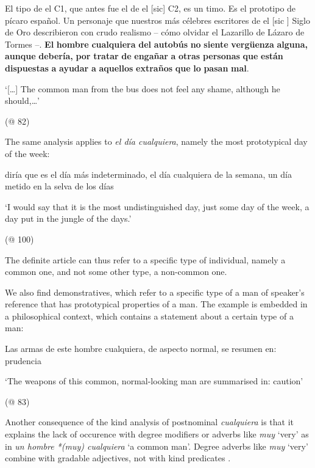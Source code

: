 \label{bkm:Ref63545986}  El tipo de el C1, que antes fue el de el [sic] C2, es un timo. Es el prototipo de pícaro español. Un personaje que nuestros más célebres escritores de el [sic ] Siglo de Oro describieron con crudo realismo – cómo olvidar el Lazarillo de Lázaro de Tormes –. \textbf{El} \textbf{hombre} \textbf{cualquiera} \textbf{del} \textbf{autobús} \textbf{no} \textbf{siente} \textbf{vergüenza} \textbf{alguna,} \textbf{aunque} \textbf{debería,} \textbf{por} \textbf{tratar} \textbf{de} \textbf{engañar} \textbf{a} \textbf{otras} \textbf{personas} \textbf{que} \textbf{están} \textbf{dispuestas} \textbf{a} \textbf{ayudar} \textbf{a} \textbf{aquellos} \textbf{extraños} \textbf{que} \textbf{lo} \textbf{pasan} \textbf{mal}.

  ‘[…] The common man from the bus does not feel any shame, although he should,…’

  (@ 82)

The same analysis applies to \textit{el día cualquiera}, namely the most prototypical day of the week:

  diría que es el día más indeterminado, el día cualquiera de la semana, un día metido en la selva de los días

  ‘I would say that it is the most undistinguished day, just some day of the week, a day put in the jungle of the days.’

  (@ 100)

The definite article can thus refer to a specific type of individual, namely a common one, and not some other type, a non-common one. 

  We also find demonstratives, which refer to a specific type of a man of speaker’s reference that has prototypical properties of a man. The example is embedded in a philosophical context, which contains a statement about a certain type of a man:

\label{bkm:Ref63545989}  Las armas de este hombre cualquiera, de aspecto normal, se resumen en: prudencia

  ‘The weapons of this common, normal-looking man are summarised in: caution’

  (@ 83)

Another consequence of the kind analysis of postnominal \textit{cualquiera} is that it explains the lack of occurence with degree modifiers or adverbs like \textit{muy} ‘very’ as in \textit{un hombre *(muy) cualquiera} ‘a common man’. Degree adverbs like \textit{muy} ‘very’ combine with gradable adjectives, not with kind predicates \citep{Kennedy1999}. 

